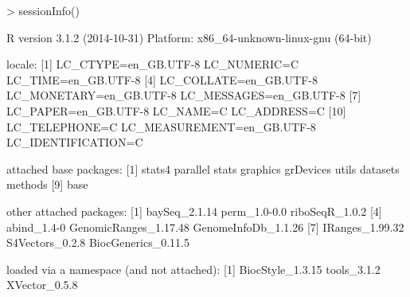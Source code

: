 \documentclass[a4paper]{article}
\begin{document}
\begin{Schunk}
\begin{Sinput}
> sessionInfo()
\end{Sinput}
\begin{Soutput}
R version 3.1.2 (2014-10-31)
Platform: x86_64-unknown-linux-gnu (64-bit)

locale:
 [1] LC_CTYPE=en_GB.UTF-8       LC_NUMERIC=C               LC_TIME=en_GB.UTF-8       
 [4] LC_COLLATE=en_GB.UTF-8     LC_MONETARY=en_GB.UTF-8    LC_MESSAGES=en_GB.UTF-8   
 [7] LC_PAPER=en_GB.UTF-8       LC_NAME=C                  LC_ADDRESS=C              
[10] LC_TELEPHONE=C             LC_MEASUREMENT=en_GB.UTF-8 LC_IDENTIFICATION=C       

attached base packages:
[1] stats4    parallel  stats     graphics  grDevices utils     datasets  methods  
[9] base     

other attached packages:
[1] baySeq_2.1.14         perm_1.0-0.0          riboSeqR_1.0.2       
[4] abind_1.4-0           GenomicRanges_1.17.48 GenomeInfoDb_1.1.26  
[7] IRanges_1.99.32       S4Vectors_0.2.8       BiocGenerics_0.11.5  

loaded via a namespace (and not attached):
[1] BiocStyle_1.3.15 tools_3.1.2      XVector_0.5.8   
\end{Soutput}
\end{Schunk}
\end{document}
